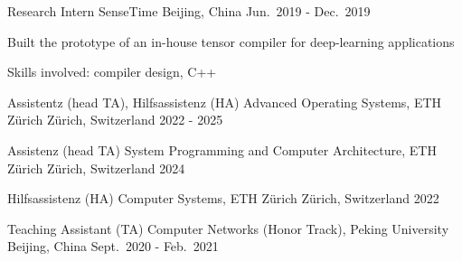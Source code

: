 
\begin{cventries}
    \cventry
    {Research Intern}
    {SenseTime}
    {Beijing, China}
    {Jun.\ 2019 - Dec.\ 2019}
    {
        \begin{cvitems}
            \item {Built the prototype of an in-house tensor compiler for
                deep-learning applications}
            \item {Skills involved: compiler design, C++}
        \end{cvitems}
    }
\end{cventries}


\begin{cventries}
    \cventry
    {Assistentz (head TA), Hilfsassistenz (HA)}
    {Advanced Operating Systems, ETH Z\"urich}
    {Z\"urich, Switzerland}
    {2022 - 2025}
    {}

    \cventry
    {Assistenz (head TA)}
    {System Programming and Computer Architecture, ETH Z\"urich}
    {Z\"urich, Switzerland}
    {2024}
    {}

    \cventry
    {Hilfsassistenz (HA)}
    {Computer Systems, ETH Z\"urich}
    {Z\"urich, Switzerland}
    {2022}
    {}

    \cventry
    {Teaching Assistant (TA)}
    {Computer Networks (Honor Track), Peking University}
    {Beijing, China}
    {Sept.\ 2020 - Feb.\ 2021}
    {}
\end{cventries}

